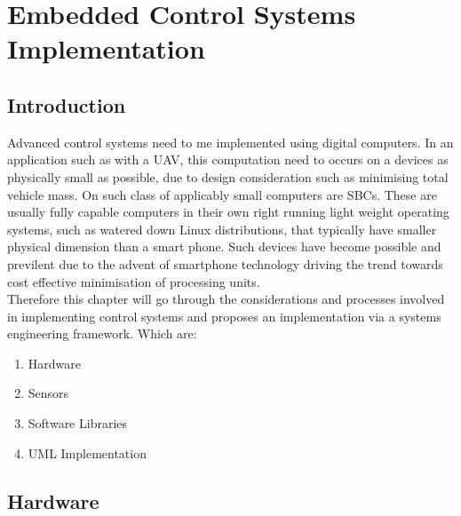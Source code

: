 \documentclass[12pt,a4paper,twoside]{report}
\begin{document}
	\newpage
		
	\chapter{Embedded Control Systems Implementation}
		
		\section{Introduction}
			
			Advanced control systems need to me implemented using digital computers. In an application such as with a UAV, this computation need to occurs on a devices as physically small as possible, due to design consideration such as minimising total vehicle mass. On such class of applicably small computers are SBCs. These are usually fully capable computers in their own right running light weight operating systems, such as watered down Linux distributions, that typically have smaller physical dimension than a smart phone. Such devices have become possible and previlent due to the advent of smartphone technology driving the trend towards cost effective minimisation of processing units. 
			\\
		 	Therefore this chapter will go through the considerations and processes involved in implementing control systems and proposes an implementation via a systems engineering framework. Which are:
			
			\begin{enumerate}
				\item
					Hardware
				\item
					Sensors
				\item
					Software Libraries
				\item 
					UML Implementation
			\end{enumerate}  
			
		\section{Hardware}
			
\end{document}
